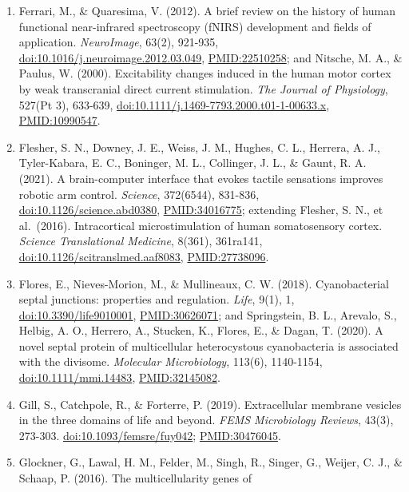 \documentclass[10pt,letterpaper]{article}
\begin{document}
\begin{enumerate}
  \texttt{arXiv:2101.\allowbreak{}03961}.
\item
  Ferrari, M., \& Quaresima, V. (2012). A brief review on the history of
  human functional near-infrared spectroscopy (fNIRS) development and
  fields of application. \emph{NeuroImage}, 63(2), 921-935,
  \href{https://doi.org/10.1016/j.neuroimage.2012.03.049}{doi:10.1016/j.neuroimage.2012.03.049},
  \url{PMID:22510258}; and Nitsche, M. A., \& Paulus, W. (2000).
  Excitability changes induced in the human motor cortex by weak
  transcranial direct current stimulation. \emph{The Journal of
  Physiology}, 527(Pt 3), 633-639,
  \href{https://doi.org/10.1111/j.1469-7793.2000.t01-1-00633.x}{doi:10.1111/j.1469-7793.2000.t01-1-00633.x},
  \url{PMID:10990547}.
\item
  Flesher, S. N., Downey, J. E., Weiss, J. M., Hughes, C. L., Herrera,
  A. J., Tyler-Kabara, E. C., Boninger, M. L., Collinger, J. L., \&
  Gaunt, R. A. (2021). A brain-computer interface that evokes tactile
  sensations improves robotic arm control. \emph{Science}, 372(6544),
  831-836,
  \href{https://doi.org/10.1126/science.abd0380}{doi:10.1126/science.abd0380},
  \url{PMID:34016775}; extending Flesher, S. N., et al.~(2016).
  Intracortical microstimulation of human somatosensory cortex.
  \emph{Science Translational Medicine}, 8(361), 361ra141,
  \href{https://doi.org/10.1126/scitranslmed.aaf8083}{doi:10.1126/scitranslmed.aaf8083},
  \url{PMID:27738096}.
\item
  Flores, E., Nieves-Morion, M., \& Mullineaux, C. W. (2018).
  Cyanobacterial septal junctions: properties and regulation.
  \emph{Life}, 9(1), 1,
  \href{https://doi.org/10.3390/life9010001}{doi:10.3390/life9010001},
  \url{PMID:30626071}; and Springstein, B. L., Arevalo, S., Helbig, A.
  O., Herrero, A., Stucken, K., Flores, E., \& Dagan, T. (2020). A novel
  septal protein of multicellular heterocystous cyanobacteria is
  associated with the divisome. \emph{Molecular Microbiology}, 113(6),
  1140-1154,
  \href{https://doi.org/10.1111/mmi.14483}{doi:10.1111/mmi.14483},
  \url{PMID:32145082}.
\item
  Gill, S., Catchpole, R., \& Forterre, P. (2019). Extracellular
  membrane vesicles in the three domains of life and beyond. \emph{FEMS
  Microbiology Reviews}, 43(3), 273-303.
  \href{https://doi.org/10.1093/femsre/fuy042}{doi:10.1093/femsre/fuy042};
  \url{PMID:30476045}.
\item
  Glockner, G., Lawal, H. M., Felder, M., Singh, R., Singer, G., Weijer,
  C. J., \& Schaap, P. (2016). The multicellularity genes of

\end{enumerate}
\end{document}
